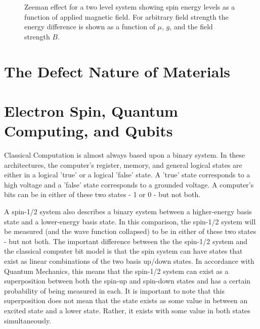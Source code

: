 \documentclass[oneside, astronomy, noacknowlegments]{BYUPhys}
\begin{document}
\begin{figure}
    \caption[Zeeman effect and resonant conditions in matter]{\label{fig:Zeeman}
     Zeeman effect for a two level system showing spin energy levels as a function of applied magnetic field. For arbitrary field strength the energy difference is shown as a function of $\mu$, $g$, and the field strength $B$.}
\end{figure}

\section{The Defect Nature of Materials}

\section{Electron Spin, Quantum Computing, and Qubits}

Classical Computation is almost always based upon a binary system. In these architectures, the computer's register, memory, and general logical states are either in a logical 'true' or a logical 'false' state. A 'true' state corresponds to a high voltage and a 'false' state corresponds to a grounded voltage. A computer's bits can be in either of these two states - 1 or 0 - but not both.

A spin-1/2 system also describes a binary system between a higher-energy basis state and a lower-energy basis state. In this comparison, the spin-1/2 system will be measured (and the wave function collapsed) to be in either of these two states - but not both. The important difference between the the spin-1/2 system and the classical computer bit model is that the spin system can have states that exist as linear combinations of the two basis up/down states. In accordance with Quantum Mechanics, this means that the spin-1/2 system can exist as a superposition between both the spin-up and spin-down states and has a certain probability of being measured in each. It is important to note that this superposition does not mean that the state exists as some value in between an excited state and a lower state. Rather, it exists with some value in both states simultaneously.
\end{document}
